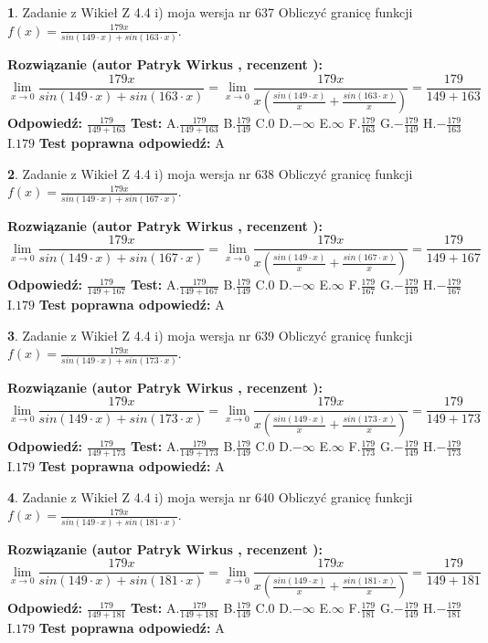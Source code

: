 \documentclass[12pt, a4paper]{article}
\theoremstyle{definition} %
\newtheorem{zad}{}
\newcommand{\zadStart}[1]{\begin{zad}#1\newline}
\newcommand{\zadStop}{\end{zad}}
\newcommand{\rozwStart}[2]{\noindent \textbf{Rozwiązanie (autor #1 , recenzent #2): }\newline}
\newcommand{\rozwStop}{\newline}
\newcommand{\odpStart}{\noindent \textbf{Odpowiedź:}\newline}
\newcommand{\odpStop}{\newline}
\newcommand{\testStart}{\noindent \textbf{Test:}\newline}
\newcommand{\testStop}{\newline}
\newcommand{\kluczStart}{\noindent \textbf{Test poprawna odpowiedź:}\newline}
\newcommand{\kluczStop}{\newline}
\begin{document}
\zadStart{Zadanie z Wikieł Z 4.4 i) moja wersja nr 637}
Obliczyć granicę funkcji $f(x)=\frac{179x}{sin(149\cdot x) +sin(163\cdot x)}$.
\zadStop
\rozwStart{Patryk Wirkus}{}
$$\lim\limits_{x\to 0}\frac{179x}{sin(149\cdot x) +sin(163\cdot x)}=\lim\limits_{x\to 0}\frac{179x}{x(\frac{sin(149\cdot x)}{x}+\frac{sin(163\cdot x)}{x})}=\frac{179}{149+163}$$
\rozwStop
\odpStart
$\frac{179}{149+163}$
\odpStop
\testStart
A.$\frac{179}{149+163}$
B.$\frac{179}{149}$
C.$0$
D.$-\infty$
E.$\infty$
F.$\frac{179}{163}$
G.$-\frac{179}{149}$
H.$-\frac{179}{163}$
I.$179$
\testStop
\kluczStart
A
\kluczStop



\zadStart{Zadanie z Wikieł Z 4.4 i) moja wersja nr 638}
Obliczyć granicę funkcji $f(x)=\frac{179x}{sin(149\cdot x) +sin(167\cdot x)}$.
\zadStop
\rozwStart{Patryk Wirkus}{}
$$\lim\limits_{x\to 0}\frac{179x}{sin(149\cdot x) +sin(167\cdot x)}=\lim\limits_{x\to 0}\frac{179x}{x(\frac{sin(149\cdot x)}{x}+\frac{sin(167\cdot x)}{x})}=\frac{179}{149+167}$$
\rozwStop
\odpStart
$\frac{179}{149+167}$
\odpStop
\testStart
A.$\frac{179}{149+167}$
B.$\frac{179}{149}$
C.$0$
D.$-\infty$
E.$\infty$
F.$\frac{179}{167}$
G.$-\frac{179}{149}$
H.$-\frac{179}{167}$
I.$179$
\testStop
\kluczStart
A
\kluczStop



\zadStart{Zadanie z Wikieł Z 4.4 i) moja wersja nr 639}
Obliczyć granicę funkcji $f(x)=\frac{179x}{sin(149\cdot x) +sin(173\cdot x)}$.
\zadStop
\rozwStart{Patryk Wirkus}{}
$$\lim\limits_{x\to 0}\frac{179x}{sin(149\cdot x) +sin(173\cdot x)}=\lim\limits_{x\to 0}\frac{179x}{x(\frac{sin(149\cdot x)}{x}+\frac{sin(173\cdot x)}{x})}=\frac{179}{149+173}$$
\rozwStop
\odpStart
$\frac{179}{149+173}$
\odpStop
\testStart
A.$\frac{179}{149+173}$
B.$\frac{179}{149}$
C.$0$
D.$-\infty$
E.$\infty$
F.$\frac{179}{173}$
G.$-\frac{179}{149}$
H.$-\frac{179}{173}$
I.$179$
\testStop
\kluczStart
A
\kluczStop



\zadStart{Zadanie z Wikieł Z 4.4 i) moja wersja nr 640}
Obliczyć granicę funkcji $f(x)=\frac{179x}{sin(149\cdot x) +sin(181\cdot x)}$.
\zadStop
\rozwStart{Patryk Wirkus}{}
$$\lim\limits_{x\to 0}\frac{179x}{sin(149\cdot x) +sin(181\cdot x)}=\lim\limits_{x\to 0}\frac{179x}{x(\frac{sin(149\cdot x)}{x}+\frac{sin(181\cdot x)}{x})}=\frac{179}{149+181}$$
\rozwStop
\odpStart
$\frac{179}{149+181}$
\odpStop
\testStart
A.$\frac{179}{149+181}$
B.$\frac{179}{149}$
C.$0$
D.$-\infty$
E.$\infty$
F.$\frac{179}{181}$
G.$-\frac{179}{149}$
H.$-\frac{179}{181}$
I.$179$
\testStop
\kluczStart
A
\kluczStop
\end{document}
